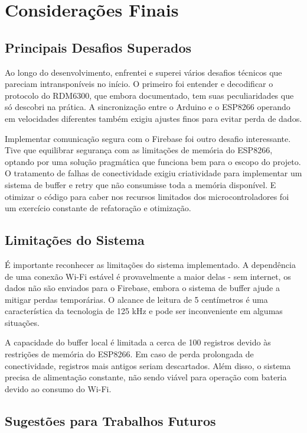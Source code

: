 \section{Considerações Finais}
\label{sec:consideracoes-implementacao}

\subsection{Principais Desafios Superados}

Ao longo do desenvolvimento, enfrentei e superei vários desafios técnicos que pareciam intransponíveis no início. O primeiro foi entender e decodificar o protocolo do RDM6300, que embora documentado, tem suas peculiaridades que só descobri na prática. A sincronização entre o Arduino e o ESP8266 operando em velocidades diferentes também exigiu ajustes finos para evitar perda de dados.

Implementar comunicação segura com o Firebase foi outro desafio interessante. Tive que equilibrar segurança com as limitações de memória do ESP8266, optando por uma solução pragmática que funciona bem para o escopo do projeto. O tratamento de falhas de conectividade exigiu criatividade para implementar um sistema de buffer e retry que não consumisse toda a memória disponível. E otimizar o código para caber nos recursos limitados dos microcontroladores foi um exercício constante de refatoração e otimização.

\subsection{Limitações do Sistema}

É importante reconhecer as limitações do sistema implementado. A dependência de uma conexão Wi-Fi estável é provavelmente a maior delas - sem internet, os dados não são enviados para o Firebase, embora o sistema de buffer ajude a mitigar perdas temporárias. O alcance de leitura de 5 centímetros é uma característica da tecnologia de 125 kHz e pode ser inconveniente em algumas situações.

A capacidade do buffer local é limitada a cerca de 100 registros devido às restrições de memória do ESP8266. Em caso de perda prolongada de conectividade, registros mais antigos seriam descartados. Além disso, o sistema precisa de alimentação constante, não sendo viável para operação com bateria devido ao consumo do Wi-Fi.

\subsection{Sugestões para Trabalhos Futuros}

